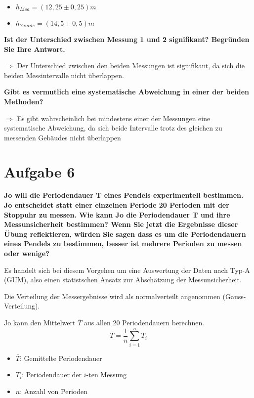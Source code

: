 \documentclass[
]{article}
\providecommand{\tightlist}{%
  \setlength{\itemsep}{0pt}\setlength{\parskip}{0pt}}
\begin{document}
\begin{itemize}
\tightlist
\item
  \(h_{Lisa}= (12,25 \pm 0,25)m\)
\item
  \(h_{Yamile}= (14,5 \pm 0,5)m\)
\end{itemize}

\textbf{Ist der Unterschied zwischen Messung 1 und 2 signifikant?
Begründen Sie Ihre Antwort.}

\(\Rightarrow\) Der Unterschied zwischen den beiden Messungen ist
signifikant, da sich die beiden Messintervalle nicht überlappen.

\textbf{Gibt es vermutlich eine systematische Abweichung in einer der
beiden Methoden?}

\(\Rightarrow\) Es gibt wahrscheinlich bei mindestens einer der
Messungen eine systematische Abweichung, da sich beide Intervalle trotz
des gleichen zu messenden Gebäudes nicht überlappen

\hypertarget{aufgabe-6}{%
\section{Aufgabe 6}\label{aufgabe-6}}

\textbf{Jo will die Periodendauer T eines Pendels experimentell
bestimmen. Jo entscheidet statt einer einzelnen Periode 20 Perioden mit
der Stoppuhr zu messen. Wie kann Jo die Periodendauer T und ihre
Messunsicherheit bestimmen? Wenn Sie jetzt die Ergebnisse dieser Übung
reflektieren, würden Sie sagen dass es um die Periodendauern eines
Pendels zu bestimmen, besser ist mehrere Perioden zu messen oder
wenige?}

Es handelt sich bei diesem Vorgehen um eine Auswertung der Daten nach
Typ-A (GUM), also einen statistschen Ansatz zur Abschätzung der
Messunsicherheit.

Die Verteilung der Messergebnisse wird als normalverteilt angenommen
(Gauss-Verteilung).

Jo kann den Mittelwert \(\overline{T}\) aus allen 20 Periodendauern
berechnen. \[\overline{T} = \frac{1}{n}\sum \limits_{i=1}^nT_i\]

\begin{itemize}
\tightlist
\item
  \(\bar{T}\): Gemittelte Periodendauer
\item
  \(T_i\): Periodendauer der \(i\)-ten Messung
\item
  \(n\): Anzahl von Perioden
\end{itemize}
\end{document}
